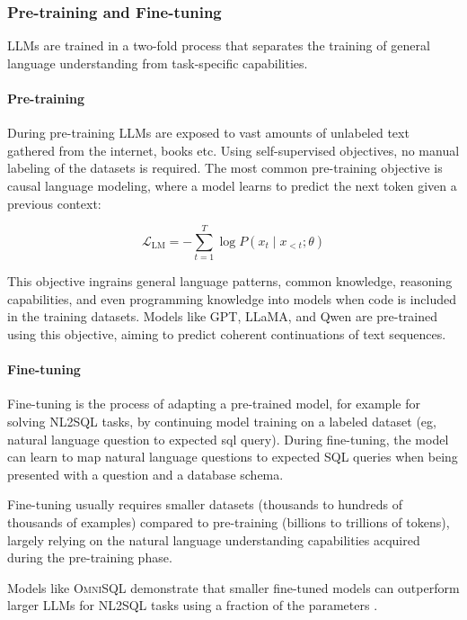 \subsubsection{Pre-training and Fine-tuning}

LLMs are trained in a two-fold process that separates the training of general
language understanding from task-specific capabilities.

\paragraph{Pre-training}

During pre-training LLMs are exposed to vast amounts of unlabeled text
gathered from the internet, books etc. Using self-supervised objectives, no
manual labeling of the datasets is required. The most common pre-training
objective is causal language modeling, where a model learns to predict the next
token given a previous context:

\begin{equation}
\mathcal{L}_{\text{LM}} = -\sum_{t=1}^{T} \log P(x_t \mid x_{<t}; \theta)
\end{equation}

This objective ingrains general language patterns, common knowledge,
reasoning capabilities, and even programming knowledge into models 
when code is included in the training datasets. Models like GPT, LLaMA, and
Qwen are pre-trained using this objective, aiming to predict coherent
continuations of text sequences.

\paragraph{Fine-tuning}

Fine-tuning is the process of adapting a pre-trained model, for example for
solving NL2SQL tasks, by continuing model training on a labeled dataset
(eg, natural language question to expected sql query). During fine-tuning, the
model can learn to map natural language questions to expected SQL queries when
being presented with a question and a database schema.

Fine-tuning usually requires smaller datasets (thousands to hundreds of
thousands of examples) compared to pre-training (billions to trillions of
tokens), largely relying on the natural language understanding capabilities
acquired during the pre-training phase.

Models like \textsc{OmniSQL} demonstrate that smaller fine-tuned models can
outperform larger LLMs for NL2SQL tasks using a fraction of the parameters
\citep{OmniSQL}.

